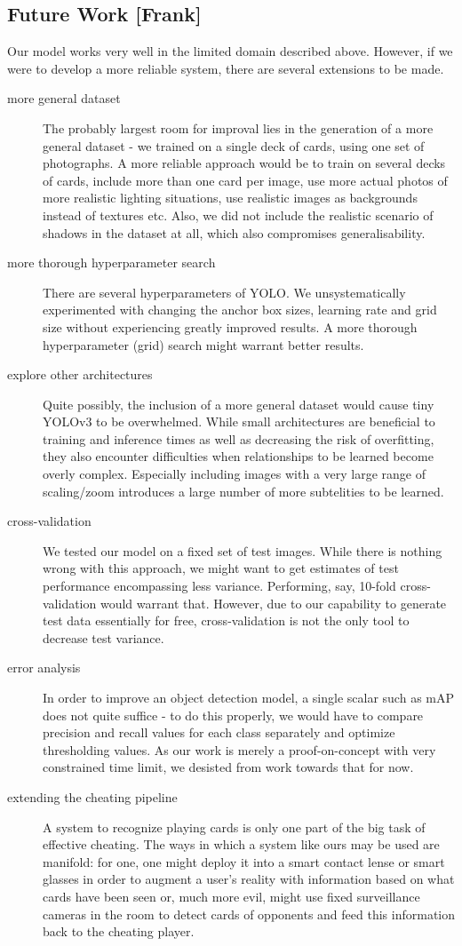 \documentclass[a4paper]{article}
\begin{document}
\subsection*{Future Work [Frank]}
Our model works very well in the limited domain described above. However, if we were to develop a more reliable system, there are several extensions to be made.
\begin{description}
\item[more general dataset] The probably largest room for improval lies in the generation of a more general dataset - we trained on a single deck of cards, using one set of photographs. A more reliable approach would be to train on several decks of cards, include more than one card per image, use more actual photos of more realistic lighting situations, use realistic images as backgrounds instead of textures etc.
Also, we did not include the realistic scenario of shadows in the dataset at all, which also compromises generalisability.
\item[more thorough hyperparameter search] There are several hyperparameters of YOLO. We unsystematically experimented with changing the anchor box sizes, learning rate and grid size without experiencing greatly improved results. A more thorough hyperparameter (grid) search might warrant better results.

\item[explore other architectures] Quite possibly, the inclusion of a more general dataset would cause tiny YOLOv3 to be overwhelmed. While small architectures are beneficial to training and inference times as well as decreasing the risk of overfitting, they also encounter difficulties when relationships to be learned become overly complex. Especially including images with a very large range of scaling/zoom introduces a large number of more subtelities to be learned.
\item[cross-validation] We tested our model on a fixed set of test images. While there is nothing wrong with this approach, we might want to get estimates of test performance encompassing less variance. Performing, say, 10-fold cross-validation would warrant that. However, due to our capability to generate test data essentially for free, cross-validation is not the only tool to decrease test variance.
\item[error analysis] In order to improve an object detection model, a single scalar such as mAP does not quite suffice - to do this properly, we would have to compare precision and recall values for each class separately and optimize thresholding values. As our work is merely a proof-on-concept with very constrained time limit, we desisted from work towards that for now.
\item[extending the cheating pipeline] A system to recognize playing cards is only one part of the big task of effective cheating. The ways in which a system like ours may be used are manifold: for one, one might deploy it into a smart contact lense or smart glasses in order to augment a user's reality with information based on what cards have been seen or, much more evil, might use fixed surveillance cameras in the room to detect cards of opponents and feed this information back to the cheating player.
\end{description}
\end{document}
